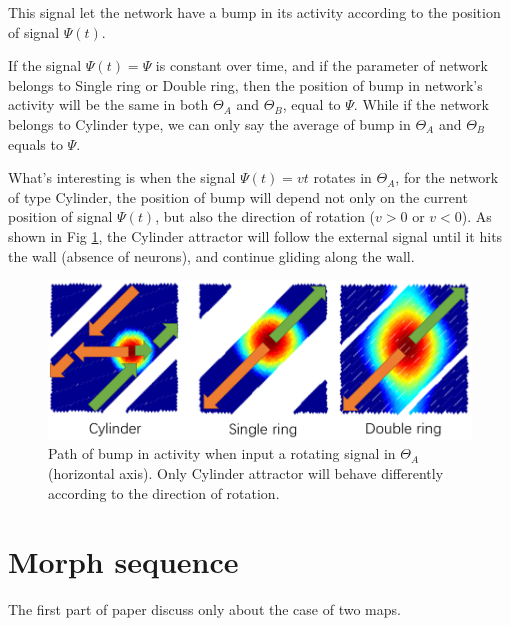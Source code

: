 \documentclass{article}
\begin{document}
	This signal let the network have a bump in its activity according to the position of signal $\Psi(t)$. 
	
	If the signal $\Psi(t)=\Psi$ is constant over time, and if the parameter of network belongs to Single ring or Double ring, then the position of bump in network's activity will be the same in both $\Theta_A$ and $\Theta_B$, equal to $\Psi$. While if the network belongs to Cylinder type, we can only say the average of bump in $\Theta_A$ and $\Theta_B$ equals to $\Psi$.
	
	What's interesting is when the signal $\Psi(t)=vt$ rotates in $\Theta_A$, for the network of type Cylinder, the position of bump will depend not only on the current position of signal $\Psi(t)$, but also the direction of rotation ($v>0$ or $v<0$). As shown in Fig \ref{fig:moving}, the Cylinder attractor will follow the external signal until it hits the wall (absence of neurons), and continue gliding along the wall.
	
	\begin{figure}[h]
		\centering
		\includegraphics[width=12cm]{moving.png}
		\caption{Path of bump in activity when input a rotating signal in $\Theta_A$ (horizontal axis). Only Cylinder attractor will behave differently according to the direction of rotation.}
		\label{fig:moving}
	\end{figure}

	\section{Morph sequence}
	The first part of paper discuss only about the case of two maps.


\end{document}
